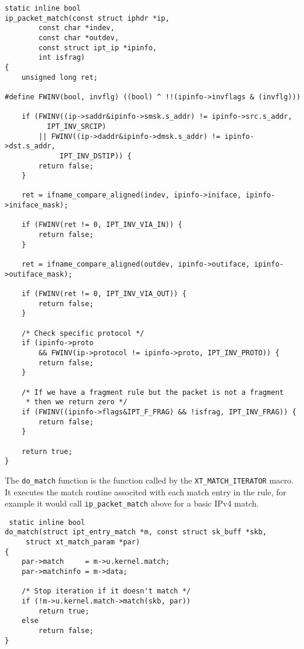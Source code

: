 \documentclass[a4paper,10pt]{article}
\newcommand{\code}[1]{\texttt{#1}}
\begin{document}
\begin{lstlisting}
static inline bool
ip_packet_match(const struct iphdr *ip,
		const char *indev,
		const char *outdev,
		const struct ipt_ip *ipinfo,
		int isfrag)
{
	unsigned long ret;

#define FWINV(bool, invflg) ((bool) ^ !!(ipinfo->invflags & (invflg)))

	if (FWINV((ip->saddr&ipinfo->smsk.s_addr) != ipinfo->src.s_addr,
		  IPT_INV_SRCIP)
	    || FWINV((ip->daddr&ipinfo->dmsk.s_addr) != ipinfo->dst.s_addr,
		     IPT_INV_DSTIP)) {
		return false;
	}

	ret = ifname_compare_aligned(indev, ipinfo->iniface, ipinfo->iniface_mask);

	if (FWINV(ret != 0, IPT_INV_VIA_IN)) {
		return false;
	}

	ret = ifname_compare_aligned(outdev, ipinfo->outiface, ipinfo->outiface_mask);

	if (FWINV(ret != 0, IPT_INV_VIA_OUT)) {
		return false;
	}

	/* Check specific protocol */
	if (ipinfo->proto
	    && FWINV(ip->protocol != ipinfo->proto, IPT_INV_PROTO)) {
		return false;
	}

	/* If we have a fragment rule but the packet is not a fragment
	 * then we return zero */
	if (FWINV((ipinfo->flags&IPT_F_FRAG) && !isfrag, IPT_INV_FRAG)) {
		return false;
	}

	return true;
}
\end{lstlisting}

The \code{do\_match} function is the function called by the
\code{XT\_MATCH\_ITERATOR} macro. It executes the match routine
associted with each match entry in the rule, for example it would call
\code{ip\_packet\_match} above for a basic IPv4 match.

\lstset{stepnumber=0}
\begin{lstlisting}
 static inline bool
do_match(struct ipt_entry_match *m, const struct sk_buff *skb,
	 struct xt_match_param *par)
{
	par->match     = m->u.kernel.match;
	par->matchinfo = m->data;

	/* Stop iteration if it doesn't match */
	if (!m->u.kernel.match->match(skb, par))
		return true;
	else
		return false;
}
\end{lstlisting}
\end{document}
